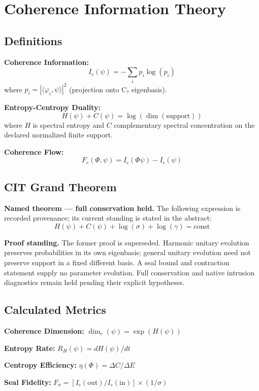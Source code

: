 \documentclass[11pt,a4paper]{article}
\begin{document}
\section{Coherence Information Theory}

\subsection{Definitions}

\textbf{Coherence Information:}
\[
I_c(\psi) = -\sum_i p_i \log(p_i)
\]
where \( p_i = |\langle\varphi_i, \psi\rangle|^2 \) (projection onto C₇ eigenbasis).

\textbf{Entropy-Centropy Duality:}
\[
H(\psi) + C(\psi) = \log(\dim(\mathrm{support}))
\]
where \(H\) is spectral entropy and \(C\) complementary spectral concentration on the declared normalized finite support.

\textbf{Coherence Flow:}
\[
F_c(\Phi, \psi) = I_c(\Phi\psi) - I_c(\psi)
\]

\subsection{CIT Grand Theorem}

\textbf{Named theorem --- full conservation held.} The following expression is recorded provenance; its current standing is stated in the abstract:
\[
H(\psi) + C(\psi) + \log(\sigma) + \log(\gamma) = \mathrm{const}
\]

\textbf{Proof standing.} The former proof is superseded. Harmonic unitary evolution preserves probabilities in its own eigenbasis; general unitary evolution need not preserve support in a fixed different basis. A seal bound and contraction statement supply no parameter evolution. Full conservation and native intrusion diagnostics remain held pending their explicit hypotheses.

\subsection{Calculated Metrics}

\textbf{Coherence Dimension:} \( \dim_c(\psi) = \exp(H(\psi)) \)

\textbf{Entropy Rate:} \( R_H(\psi) = dH(\psi)/dt \)

\textbf{Centropy Efficiency:} \( \eta(\Phi) = \Delta C / \Delta E \)

\textbf{Seal Fidelity:} \( F_\sigma = [I_c(\mathrm{out})/I_c(\mathrm{in})] \times (1/\sigma) \)
\end{document}
